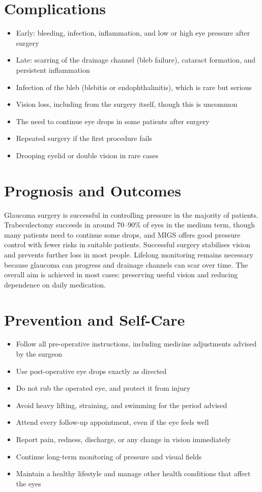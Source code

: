 \section*{Complications}
\begin{itemize}
    \item Early: bleeding, infection, inflammation, and low or high eye pressure after surgery
    \item Late: scarring of the drainage channel (bleb failure), cataract formation, and persistent inflammation
    \item Infection of the bleb (blebitis or endophthalmitis), which is rare but serious
    \item Vision loss, including from the surgery itself, though this is uncommon
    \item The need to continue eye drops in some patients after surgery
    \item Repeated surgery if the first procedure fails
    \item Drooping eyelid or double vision in rare cases
\end{itemize}

\section*{Prognosis and Outcomes}
Glaucoma surgery is successful in controlling pressure in the majority of patients. Trabeculectomy succeeds in around 70--90\% of eyes in the medium term, though many patients need to continue some drops, and MIGS offers good pressure control with fewer risks in suitable patients. Successful surgery stabilises vision and prevents further loss in most people. Lifelong monitoring remains necessary because glaucoma can progress and drainage channels can scar over time. The overall aim is achieved in most cases: preserving useful vision and reducing dependence on daily medication.

\section*{Prevention and Self-Care}
\begin{itemize}
    \item Follow all pre-operative instructions, including medicine adjustments advised by the surgeon
    \item Use post-operative eye drops exactly as directed
    \item Do not rub the operated eye, and protect it from injury
    \item Avoid heavy lifting, straining, and swimming for the period advised
    \item Attend every follow-up appointment, even if the eye feels well
    \item Report pain, redness, discharge, or any change in vision immediately
    \item Continue long-term monitoring of pressure and visual fields
    \item Maintain a healthy lifestyle and manage other health conditions that affect the eyes
\end{itemize}

